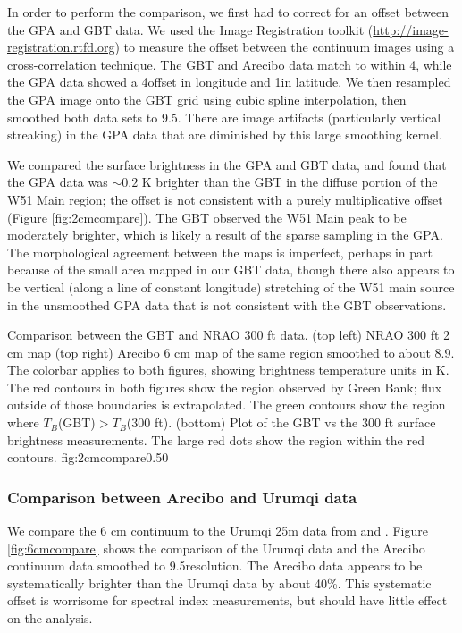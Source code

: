 In order to perform the comparison, we first had to correct for an offset
between the GPA and GBT data.  We used the Image Registration toolkit
(\url{http://image-registration.rtfd.org}) to measure the offset between the continuum
images using a cross-correlation technique.
The GBT and Arecibo data match to within 4\arcsec, while the GPA data showed
a 4\arcmin offset in longitude and 1\arcmin in latitude.  We then resampled
the GPA image onto the GBT grid using cubic spline interpolation, then smoothed
both data sets to 9.5\arcmin.  There are image artifacts (particularly
vertical streaking) in the GPA data that are diminished by this large
smoothing kernel.

We compared the surface brightness in the GPA and GBT data, and found that the
GPA data was $\sim0.2$ K brighter than the GBT in the diffuse portion of the
W51 Main region; the offset is not consistent with a purely multiplicative
offset (Figure \ref{fig:2cmcompare}).  The GBT observed the W51 Main peak to be
moderately brighter, which is likely a result of the sparse sampling in the
GPA.  The morphological agreement between the maps is imperfect, perhaps in
part because of the small area mapped in our GBT data, though there also
appears to be vertical (along a line of constant longitude) stretching of the
W51 main source in the unsmoothed GPA data that is not consistent with the GBT
observations.

{Comparison between the GBT and NRAO 300 ft \citep{Langston2000a} data.
(top left) NRAO 300 ft 2 cm map
(top right) Arecibo 6 cm map of the same region smoothed to about 8.9\arcmin. 
The colorbar applies to both figures,
showing brightness temperature units in K.  The red contours in both figures
show the region observed by Green Bank; flux outside of those boundaries is
extrapolated.  The green contours show the region where $T_B$(GBT)$>T_B$(300 ft).
(bottom) Plot of the GBT vs the 300 ft surface brightness measurements.
The large red dots show the region within the red contours.  
}
{fig:2cmcompare}{0.5}{0}

\subsubsection{Comparison between Arecibo and Urumqi data}
We compare the 6 cm continuum to the Urumqi 25m data from \citet{Sun2007a} and
\citet{Sun2011a}.  Figure \ref{fig:6cmcompare} shows the comparison of the
Urumqi data and the Arecibo continuum data smoothed to 9.5\arcmin resolution.
The Arecibo data appears to be systematically brighter than the Urumqi data
by about 40\%.  This systematic offset is worrisome for spectral index
measurements, but should have little effect on the \formaldehyde analysis.


